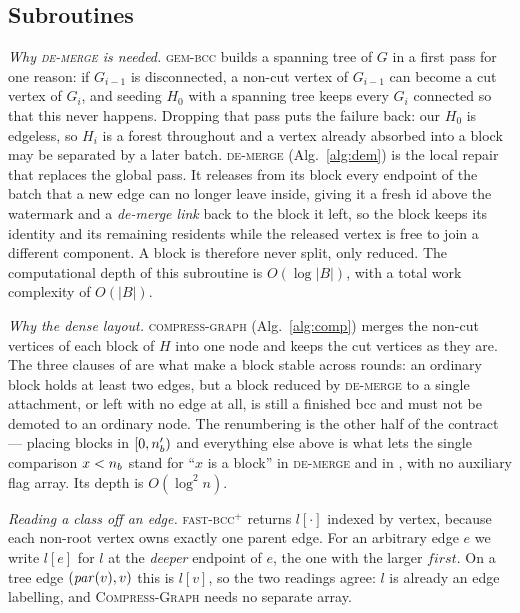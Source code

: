 \documentclass[11pt]{article}
\begin{document}
\subsection{Subroutines}

\noindent
\emph{Why \textsc{de-merge} is needed.} \textsc{gem-bcc} builds a spanning tree
of $G$ in a first pass for one reason: if $G_{i-1}$ is disconnected, a non-cut
vertex of $G_{i-1}$ can become a cut vertex of $G_i$, and seeding $H_0$ with a
spanning tree keeps every $G_i$ connected so that this never happens. Dropping
that pass puts the failure back: our $H_0$ is edgeless, so $H_i$ is a forest
throughout and a vertex already absorbed into a block may be separated by a
later batch. \textsc{de-merge} (Alg.~\ref{alg:dem}) is the local repair that
replaces the global pass. It releases from its block every endpoint of the
batch that a new edge can no longer leave inside, giving it a fresh id above
the watermark and a \emph{de-merge link} back to the block it left, so the
block keeps its identity and its remaining residents while the released vertex
is free to join a different component. A block is therefore never split, only
reduced. The computational depth of this subroutine is $O(\log|B|)$, with a
total work complexity of $O(|B|)$.

\medskip\noindent
\emph{Why the dense layout.} \textsc{compress-graph} (Alg.~\ref{alg:comp})
merges the non-cut vertices of each block of $H$ into one node and keeps the
cut vertices as they are. The three clauses of \FBlk{} are what make a block
stable across rounds: an ordinary block holds at least two edges, but a block
reduced by \textsc{de-merge} to a single attachment, or left with no edge at
all, is still a finished bcc and must not be demoted to an ordinary node. The
renumbering is the other half of the contract --- placing blocks in
$[0,n_b')$ and everything else above is what lets the single comparison
$x < n_b$ stand for ``$x$ is a block'' in \textsc{de-merge} and in
\FPlain{}, with no auxiliary flag array. Its depth is $O(\log^2 n)$.

\medskip\noindent
\emph{Reading a class off an edge.} \textsc{fast-bcc}$^{+}$ returns $l[\cdot]$
indexed by vertex, because each non-root vertex owns exactly one parent edge.
For an arbitrary edge $e$ we write $l[e]$ for $l$ at the \emph{deeper} endpoint
of $e$, the one with the larger $\mathit{first}$. On a tree edge
$(\mathit{par}(v),v)$ this is $l[v]$, so the two readings agree: $l$ is already an
edge labelling, and \textsc{Compress-Graph} needs no separate array.
\end{document}
